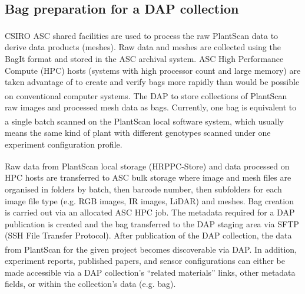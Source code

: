 \documentclass{llncs}
\begin{document}
\subsection{Bag preparation for a DAP collection}


CSIRO ASC shared facilities \cite{ASC} are used to process the raw
PlantScan\textsuperscript{\texttrademark} data to derive data products (meshes).
Raw data and meshes are collected using the BagIt format \cite{Kunze2011} and
stored in the ASC archival system. ASC High Performance Compute (HPC) hosts
(systems with high processor count and large memory) are taken advantage of to
create and verify bags more rapidly than would be possible on conventional
computer systems. The DAP to store collections of
PlantScan\textsuperscript{\texttrademark} 
raw images and processed mesh data as bags. Currently, one bag is equivalent to
a single batch scanned on the
PlantScan\textsuperscript{\texttrademark}
local software system, which usually means the same kind of plant with different
genotypes scanned under one  experiment configuration profile.  


Raw data from
PlantScan\textsuperscript{\texttrademark} 
local storage (HRPPC-Store) and data processed on HPC hosts are transferred to
ASC bulk storage where image and mesh files are organised in folders by batch,
then barcode number, then subfolders for each image file type (e.g. RGB images,
IR images, LiDAR) and meshes. Bag creation is carried out via an allocated ASC
HPC job.
The metadata required for a DAP publication is created and the bag transferred
to the DAP staging area via SFTP (SSH File Transfer Protocol). After publication
of the DAP collection, the data from PlantScan\textsuperscript{\texttrademark}
for the given project becomes
discoverable via DAP. In addition, experiment reports, published papers, and
sensor configurations can either be made accessible via a DAP collection's
``related materials'' links, other metadata fields, or within the collection's
data (e.g. bag).
\end{document}
